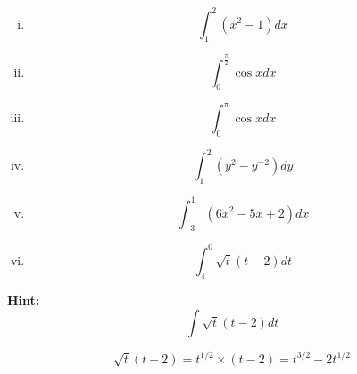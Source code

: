 \documentclass[]{article}
\begin{document}
\begin{multicols}{2}
	\begin{enumerate}[(i)]
		\item \[ \int^{2}_{1} (x^2-1) dx \]
		
		
		\item \[ \int^{\frac{\pi}{2}}_{0} \cos x dx \]
		
		\item \[ \int^{\pi}_{0} \cos x dx \]
		
		\item \[ \int^{2}_{1} (y^2 - y^{-2}) dy \]
		
		
		\item \[ \int^{1}_{-3} (6x^2 -5x + 2)dx \]
		
		
		
		
		\item \[ \int^0_4 \sqrt{t}(t-2) dt \]
		
		
		
		
		
	\end{enumerate}
\end{multicols}

\begin{framed}
	\textbf{Hint:} 
	\[ \int \sqrt{t}(t-2) dt \]
	
	\[ \sqrt{t}(t-2) = t^{1/2} \times (t - 2) = t^{3/2} - 2t^{1/2}\]
	
\end{framed}




\end{document}

